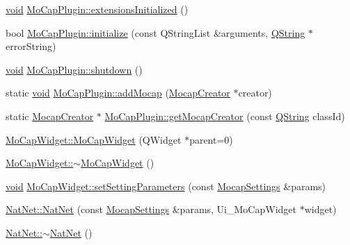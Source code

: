 \begin{DoxyCompactItemize}
\item 
\hyperlink{group___u_a_v_objects_plugin_ga444cf2ff3f0ecbe028adce838d373f5c}{void} \hyperlink{group___mo_cap_plugin_ga44d4c75032b9cb5698f876ff3cee5e09}{\-Mo\-Cap\-Plugin\-::extensions\-Initialized} ()
\item 
bool \hyperlink{group___mo_cap_plugin_ga91a5975a6eb4f0771b265669e68b9732}{\-Mo\-Cap\-Plugin\-::initialize} (const \-Q\-String\-List \&arguments, \hyperlink{group___u_a_v_objects_plugin_gab9d252f49c333c94a72f97ce3105a32d}{\-Q\-String} $\ast$error\-String)
\item 
\hyperlink{group___u_a_v_objects_plugin_ga444cf2ff3f0ecbe028adce838d373f5c}{void} \hyperlink{group___mo_cap_plugin_ga6ceccf865e672ec6799046772bb33346}{\-Mo\-Cap\-Plugin\-::shutdown} ()
\item 
static \hyperlink{group___u_a_v_objects_plugin_ga444cf2ff3f0ecbe028adce838d373f5c}{void} \hyperlink{group___mo_cap_plugin_ga6af38b170105a0cbf49fcd99f3765f76}{\-Mo\-Cap\-Plugin\-::add\-Mocap} (\hyperlink{class_mocap_creator}{\-Mocap\-Creator} $\ast$creator)
\item 
static \hyperlink{class_mocap_creator}{\-Mocap\-Creator} $\ast$ \hyperlink{group___mo_cap_plugin_ga1d86e516f13c5ef45cf76400e74fe8e5}{\-Mo\-Cap\-Plugin\-::get\-Mocap\-Creator} (const \hyperlink{group___u_a_v_objects_plugin_gab9d252f49c333c94a72f97ce3105a32d}{\-Q\-String} class\-Id)
\item 
\hyperlink{group___mo_cap_plugin_ga36cbb83db56d6d7eb8f5d30717d2c5e4}{\-Mo\-Cap\-Widget\-::\-Mo\-Cap\-Widget} (\-Q\-Widget $\ast$parent=0)
\item 
\hyperlink{group___mo_cap_plugin_gae095eb46b9b054f9601f677e9d82ad49}{\-Mo\-Cap\-Widget\-::$\sim$\-Mo\-Cap\-Widget} ()
\item 
\hyperlink{group___u_a_v_objects_plugin_ga444cf2ff3f0ecbe028adce838d373f5c}{void} \hyperlink{group___mo_cap_plugin_ga49fc96a517fa87b95341072a5bacd7f9}{\-Mo\-Cap\-Widget\-::set\-Setting\-Parameters} (const \hyperlink{group___mo_cap_plugin_ga6083347a5b3eb70e360f599354dc0f0b}{\-Mocap\-Settings} \&params)
\item 
\hyperlink{group___mo_cap_plugin_gaa94c0d1f5d60294b81cdb7d04f50c13e}{\-Nat\-Net\-::\-Nat\-Net} (const \hyperlink{group___mo_cap_plugin_ga6083347a5b3eb70e360f599354dc0f0b}{\-Mocap\-Settings} \&params, \-Ui\-\_\-\-Mo\-Cap\-Widget $\ast$widget)
\item 
\hyperlink{group___mo_cap_plugin_ga119cde1cc51a6b41f0e064565467c398}{\-Nat\-Net\-::$\sim$\-Nat\-Net} ()
\item 

\end{DoxyCompactItemize}

